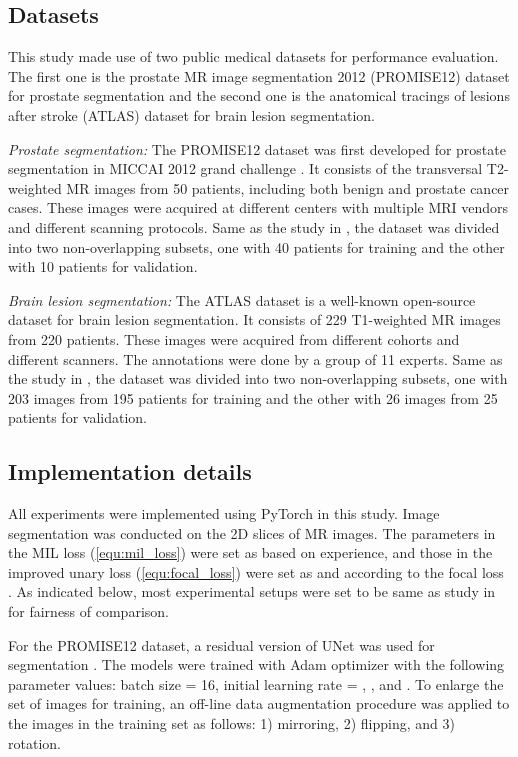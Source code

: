 \documentclass[runningheads]{llncs}
\begin{document}
\subsection{Datasets}
This study made use of two public medical datasets for performance evaluation. The first one is the prostate MR image segmentation 2012 (PROMISE12) dataset \cite{litjens2014evaluation} for prostate segmentation and the second one is the anatomical tracings of lesions after stroke (ATLAS) dataset \cite{liew2018large} for brain lesion segmentation. 



\textit{Prostate segmentation:} The PROMISE12 dataset was first developed for prostate segmentation in MICCAI 2012 grand challenge \cite{litjens2014evaluation}. It consists of the transversal T2-weighted MR images from 50 patients, including both benign and prostate cancer cases. These images were acquired at different centers with multiple MRI vendors and different scanning protocols. Same as the study in \cite{kervadec2020bounding}, the dataset was divided into two non-overlapping subsets, one with 40 patients for training and the other with 10 patients for validation. 


\textit{Brain lesion segmentation:} The ATLAS dataset is a well-known open-source dataset for brain lesion segmentation. It consists of 229 T1-weighted MR images from 220 patients. These images were acquired from different cohorts and different scanners. The annotations were done by a group of 11 experts. Same as the study in \cite{kervadec2020bounding}, the dataset was divided into two non-overlapping subsets, one with 203 images from 195 patients for training and the other with 26 images from 25 patients for validation. 


\subsection{Implementation details}
All experiments were implemented using PyTorch in this study. Image segmentation was conducted on the 2D slices of MR images. The parameters in the MIL loss (\ref{equ:mil_loss}) were set as  based on experience, and those in the improved unary loss (\ref{equ:focal_loss}) were set as  and  according to the focal loss \cite{ross2017focal}. As indicated below, most experimental setups were set to be same as study in \cite{kervadec2020bounding} for fairness of comparison.

For the PROMISE12 dataset, a residual version of UNet \cite{ronneberger2015u} was used for segmentation \cite{kervadec2020bounding}. The models were trained with Adam optimizer \cite{kingma2014adam} with the following parameter values: batch size = 16, initial learning rate = , , and . To enlarge the set of images for training, an off-line data augmentation procedure \cite{kervadec2020bounding} was applied to the images in the training set as follows: 1) mirroring, 2) flipping, and 3) rotation.
\end{document}
